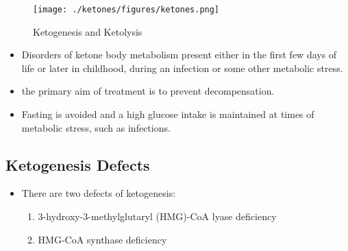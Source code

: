 \documentclass{scrartcl}
\begin{document}
\begin{figure}[htbp]
\centering
\texttt{[image: ./ketones/figures/ketones.png]}
\caption{\label{fig:orgfb52f97}
Ketogenesis and Ketolysis}
\end{figure}

\begin{itemize}
\item Disorders of ketone body metabolism present either in the first few
days of life or later in childhood, during an infection or some
other metabolic stress.
\item the primary aim of treatment is to prevent decompensation.
\item Fasting is avoided and a high glucose intake is maintained at times
of metabolic stress, such as infections.
\end{itemize}

\subsection{Ketogenesis Defects}
\label{sec:org5b75e3c}
\begin{itemize}
\item There are two defects of ketogenesis:
\begin{enumerate}
\item 3-hydroxy-3-methylglutaryl (HMG)-CoA lyase deficiency
\item HMG-CoA synthase deficiency
\end{enumerate}
\end{itemize}
\end{document}
